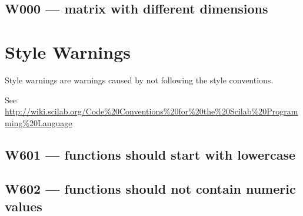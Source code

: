 \subsection{W000 --- matrix with different dimensions}




\section{Style Warnings}



Style warnings are warnings caused by not following the style conventions.



See \url{http://wiki.scilab.org/Code%20Conventions%20for%20the%20Scilab%20Programming%20Language}



\subsection{W601 --- functions should start with lowercase}




\subsection{W602 --- functions should not contain numeric values}




